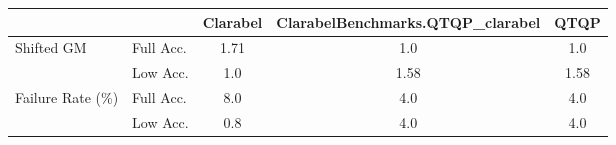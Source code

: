 \begin{tabular}{|l|l|c|c|c|}
  \hline
   &  & \textbf{Clarabel} & \textbf{ClarabelBenchmarks.QTQP\_clarabel} & \textbf{QTQP} \\
  \hline
  Shifted GM & Full Acc. & 1.71 & 1.0 & 1.0 \\
   & Low Acc. & 1.0 & 1.58 & 1.58 \\
  Failure Rate (\%) & Full Acc. & 8.0 & 4.0 & 4.0 \\
   & Low Acc. & 0.8 & 4.0 & 4.0 \\
  \hline
\end{tabular}
